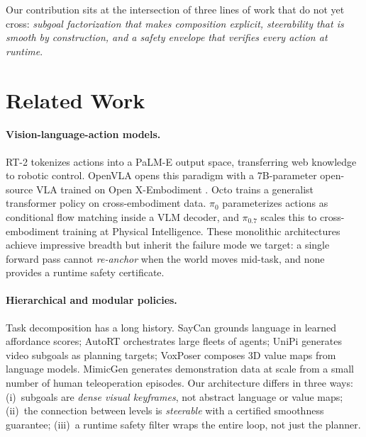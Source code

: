 \documentclass[11pt,a4paper]{article}
\begin{document}
Our contribution sits at the intersection of three lines of work that do not yet
cross: \emph{subgoal factorization that makes composition explicit, steerability
that is smooth by construction, and a safety envelope that verifies every action
at runtime}.

\section{Related Work}
\label{sec:related}

\paragraph{Vision-language-action models.}
RT-2 \cite{rt2} tokenizes actions into a PaLM-E output space, transferring web
knowledge to robotic control. OpenVLA \cite{openvla} opens this paradigm with a
7B-parameter open-source VLA trained on Open X-Embodiment \cite{oxe}. Octo
\cite{octo} trains a generalist transformer policy on cross-embodiment data.
$\pi_0$ \cite{pi0} parameterizes actions as conditional flow matching inside a
VLM decoder, and $\pi_0.7$ \cite{pi07} scales this to cross-embodiment training
at Physical Intelligence. These monolithic architectures achieve impressive breadth
but inherit the failure mode we target: a single forward pass cannot
\emph{re-anchor} when the world moves mid-task, and none provides a
runtime safety certificate.

\paragraph{Hierarchical and modular policies.}
Task decomposition has a long history. SayCan \cite{saycan} grounds language in
learned affordance scores; AutoRT \cite{autort} orchestrates large fleets of
agents; UniPi \cite{unipi} generates video subgoals as planning targets;
VoxPoser \cite{voxposer} composes 3D value maps from language models.
MimicGen \cite{mimicgen} generates demonstration data at scale from a small
number of human teleoperation episodes. Our architecture differs in three ways:
(i)~subgoals are \emph{dense visual keyframes}, not abstract language or
value maps; (ii)~the connection between levels is \emph{steerable} with a
certified smoothness guarantee; (iii)~a runtime safety filter wraps the entire
loop, not just the planner.
\end{document}
